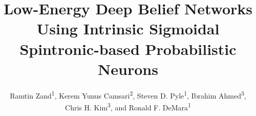 \documentclass[sigconf]{acmart}
\begin{document}
\pagestyle{empty}



\title{Low-Energy Deep Belief Networks Using Intrinsic Sigmoidal Spintronic-based Probabilistic Neurons}

\iffalse
\author{Ramtin Zand}
\orcid{0000-0002-1786-1152}
\affiliation{%
  \institution{University of Central Florida}
  \city{Orlando} 
  \state{Florida} 
  \postcode{32816-2362}
}
\email{ramtinmz@knights.ucf.edu}

\author{Kerem Yunes Camsari}
\affiliation{%
  \institution{Purdue University}
  \streetaddress{P.O. Box 1212}
  \city{West Lafayette} 
  \state{Indiana} 
  \postcode{47907}
}
\email{webmaster@marysville-ohio.com}

\author{Lars Th{\o}rv{\"a}ld}
\affiliation{%
  \institution{The Th{\o}rv{\"a}ld Group}
  \streetaddress{1 Th{\o}rv{\"a}ld Circle}
  \city{Hekla} 
  \country{Iceland}}
\email{larst@affiliation.org}

\author{Valerie B\'eranger}
\affiliation{%
  \institution{Inria Paris-Rocquencourt}
  \city{Rocquencourt}
  \country{France}
}
\author{Aparna Patel} 
\affiliation{%
 \institution{Rajiv Gandhi University}
 \streetaddress{Rono-Hills}
 \city{Doimukh} 
 \state{Arunachal Pradesh}
 \country{India}}
\author{Huifen Chan}
\affiliation{%
  \institution{Tsinghua University}
  \streetaddress{30 Shuangqing Rd}
  \city{Haidian Qu} 
  \state{Beijing Shi}
  \country{China}
}

\author{Charles Palmer}
\affiliation{%
  \institution{Palmer Research Laboratories}
  \streetaddress{8600 Datapoint Drive}
  \city{San Antonio}
  \state{Texas} 
  \postcode{78229}}f
\email{cpalmer@prl.com}

\fi

\author{Ramtin Zand\textsuperscript{1}, Kerem Yunus Camsari\textsuperscript{2}, Steven D. Pyle\textsuperscript{1}, Ibrahim Ahmed\textsuperscript{3}, \\ Chris H. Kim\textsuperscript{3}, and Ronald F. DeMara\textsuperscript{1}}
\end{document}
